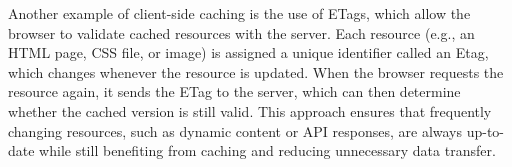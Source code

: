 Another example of client-side caching is the use of ETags, which allow the browser to validate cached resources with the server. 
Each resource (e.g., an HTML page, CSS file, or image) is assigned a unique identifier called an Etag, which changes whenever the resource is updated. 
When the browser requests the resource again, it sends the ETag to the server, which can then determine whether the cached version is still valid. 
This approach ensures that frequently changing resources, such as dynamic content or API responses,
are always up-to-date while still benefiting from caching and reducing unnecessary data transfer.



   


